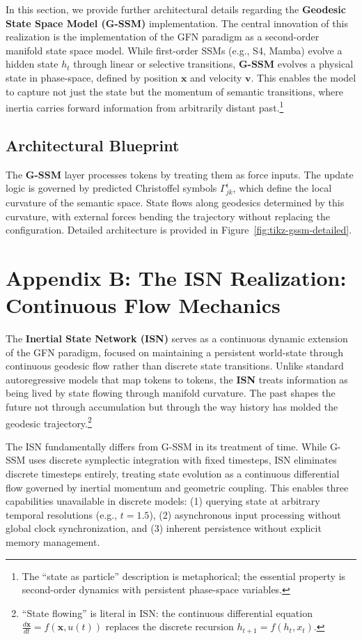 \documentclass[12pt,a4paper]{article}
\begin{document}
In this section, we provide further architectural details regarding the \textbf{Geodesic State Space Model (G-SSM)} implementation. The central innovation of this realization is the implementation of the GFN paradigm as a second-order manifold state space model. While first-order SSMs (e.g., S4, Mamba) evolve a hidden state $h_t$ through linear or selective transitions, \textbf{G-SSM} evolves a physical state in phase-space, defined by position $\mathbf{x}$ and velocity $\mathbf{v}$. This enables the model to capture not just the state but the momentum of semantic transitions, where inertia carries forward information from arbitrarily distant past.\footnote{The ``state as particle'' description is metaphorical; the essential property is second-order dynamics with persistent phase-space variables.}

\subsection{Architectural Blueprint}

The \textbf{G-SSM} layer processes tokens by treating them as force inputs. The update logic is governed by predicted Christoffel symbols $\Gamma^i_{jk}$, which define the local curvature of the semantic space. State flows along geodesics determined by this curvature, with external forces bending the trajectory without replacing the configuration. Detailed architecture is provided in Figure~\ref{fig:tikz-gssm-detailed}.

\section{Appendix B: The ISN Realization: Continuous Flow Mechanics}
\label{sec:appendix-reality}

The \textbf{Inertial State Network (ISN)} serves as a continuous dynamic extension of the GFN paradigm, focused on maintaining a persistent world-state through continuous geodesic flow rather than discrete state transitions. Unlike standard autoregressive models that map tokens to tokens, the \textbf{ISN} treats information as being lived by state flowing through manifold curvature. The past shapes the future not through accumulation but through the way history has molded the geodesic trajectory.\footnote{``State flowing'' is literal in ISN: the continuous differential equation $\frac{d\mathbf{x}}{dt} = f(\mathbf{x}, u(t))$ replaces the discrete recursion $h_{t+1} = f(h_t, x_t)$.}

The ISN fundamentally differs from G-SSM in its treatment of time. While G-SSM uses discrete symplectic integration with fixed timesteps, ISN eliminates discrete timesteps entirely, treating state evolution as a continuous differential flow governed by inertial momentum and geometric coupling. This enables three capabilities unavailable in discrete models: (1) querying state at arbitrary temporal resolutions (e.g., $t=1.5$), (2) asynchronous input processing without global clock synchronization, and (3) inherent persistence without explicit memory management.
\end{document}
